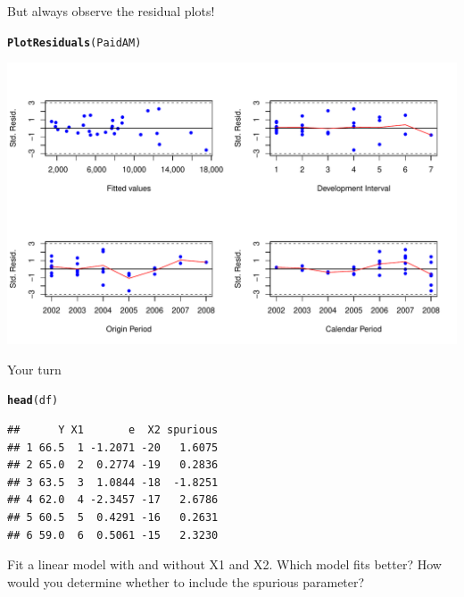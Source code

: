 \documentclass[xcolor=dvipsnames]{beamer}\usepackage{graphicx, color}
\makeatletter
\def\maxwidth{ %
  \ifdim\Gin@nat@width>\linewidth
    \linewidth
  \else
    \Gin@nat@width
  \fi
}
\newcommand{\hlfunctioncall}[1]{\textcolor[rgb]{0.501960784313725,0,0.329411764705882}{\textbf{#1}}}%
\newenvironment{kframe}{%
 \def\at@end@of@kframe{}%
 \ifinner\ifhmode%
  \def\at@end@of@kframe{\end{minipage}}%
  \begin{minipage}{\columnwidth}%
 \fi\fi%
 \def\FrameCommand##1{\hskip\@totalleftmargin \hskip-\fboxsep
 \colorbox{shadecolor}{##1}\hskip-\fboxsep
     \hskip-\linewidth \hskip-\@totalleftmargin \hskip\columnwidth}%
 \MakeFramed {\advance\hsize-\width
   \@totalleftmargin\z@ \linewidth\hsize
   \@setminipage}}%
 {\par\unskip\endMakeFramed%
 \at@end@of@kframe}
\newenvironment{knitrout}{}{} %
\makeatother
\begin{document}
\begin{frame}[fragile]{But always observe the residual plots!}
\begin{knitrout}
\color{fgcolor}\begin{kframe}
\begin{alltt}
\hlfunctioncall{PlotResiduals}(PaidAM)
\end{alltt}
\end{kframe}
\includegraphics[width=\maxwidth]{figure/ResidualPlotsAM} 

\end{knitrout}

\end{frame}

\begin{frame}[fragile]{Your turn}
\begin{knitrout}
\color{fgcolor}\begin{kframe}
\begin{alltt}
\hlfunctioncall{head}(df)
\end{alltt}
\begin{verbatim}
##      Y X1       e  X2 spurious
## 1 66.5  1 -1.2071 -20   1.6075
## 2 65.0  2  0.2774 -19   0.2836
## 3 63.5  3  1.0844 -18  -1.8251
## 4 62.0  4 -2.3457 -17   2.6786
## 5 60.5  5  0.4291 -16   0.2631
## 6 59.0  6  0.5061 -15   2.3230
\end{verbatim}
\end{kframe}
\end{knitrout}

Fit a linear model with and without X1 and X2. Which model fits better? How would you determine whether to include the spurious parameter?
\end{frame}
\end{document}
